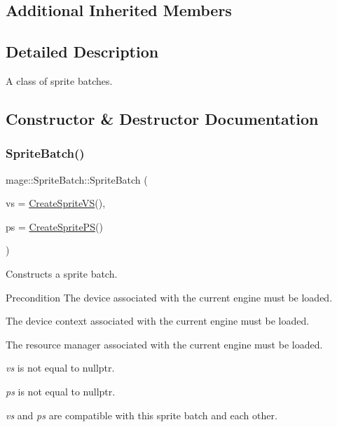 \subsection*{Additional Inherited Members}


\subsection{Detailed Description}
A class of sprite batches. 

\subsection{Constructor \& Destructor Documentation}
\hypertarget{classmage_1_1_sprite_batch_ac5247e922d22bee4006166a3462c61c9}{}\label{classmage_1_1_sprite_batch_ac5247e922d22bee4006166a3462c61c9} 
\subsubsection{\texorpdfstring{Sprite\+Batch()}{SpriteBatch()}\hspace{0.1cm}{\footnotesize\ttfamily [1/4]}}
{\footnotesize\ttfamily mage\+::\+Sprite\+Batch\+::\+Sprite\+Batch (\begin{DoxyParamCaption}\item[{\hyperlink{namespacemage_a1e01ae66713838a7a67d30e44c67703e}{Shared\+Ptr}$<$ const \hyperlink{classmage_1_1_vertex_shader}{Vertex\+Shader} $>$}]{vs = {\ttfamily \hyperlink{namespacemage_ab9ab12e1c1b17f5d218eb7396e6fda40}{Create\+Sprite\+VS}()},  }\item[{\hyperlink{namespacemage_a1e01ae66713838a7a67d30e44c67703e}{Shared\+Ptr}$<$ const \hyperlink{namespacemage_ac98506b7edd999ea43ec46fbd0330238}{Pixel\+Shader} $>$}]{ps = {\ttfamily \hyperlink{namespacemage_acf33218f09d9c43ecdb0d029ddf6f7d7}{Create\+Sprite\+PS}()} }\end{DoxyParamCaption})\hspace{0.3cm}{\ttfamily [explicit]}}

Constructs a sprite batch.

\begin{DoxyPrecond}{Precondition}
The device associated with the current engine must be loaded. 

The device context associated with the current engine must be loaded. 

The resource manager associated with the current engine must be loaded. 

{\itshape vs} is not equal to {\ttfamily nullptr}. 

{\itshape ps} is not equal to {\ttfamily nullptr}. 

{\itshape vs} and {\itshape ps} are compatible with this sprite batch and each other. 
\end{DoxyPrecond}


